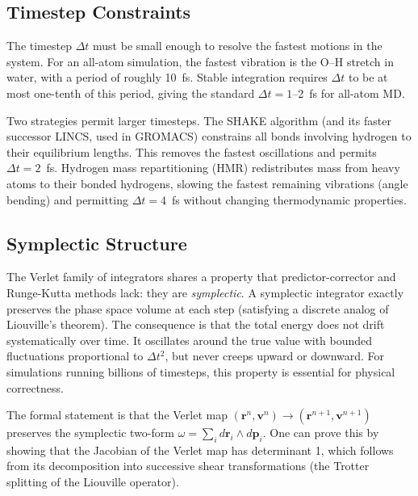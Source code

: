 \subsection{Timestep Constraints}
\label{sec:timestep}

The timestep $\Delta t$ must be small enough to resolve the fastest motions in the system. For an all-atom simulation, the fastest vibration is the O--H stretch in water, with a period of roughly 10~fs. Stable integration requires $\Delta t$ to be at most one-tenth of this period, giving the standard $\Delta t = 1$--2~fs for all-atom MD.

Two strategies permit larger timesteps. The SHAKE algorithm (and its faster successor LINCS, used in GROMACS) constrains all bonds involving hydrogen to their equilibrium lengths. This removes the fastest oscillations and permits $\Delta t = 2$~fs. Hydrogen mass repartitioning (HMR) redistributes mass from heavy atoms to their bonded hydrogens, slowing the fastest remaining vibrations (angle bending) and permitting $\Delta t = 4$~fs without changing thermodynamic properties.

\subsection{Symplectic Structure}
\label{sec:symplectic}

The Verlet family of integrators shares a property that predictor-corrector and Runge-Kutta methods lack: they are \emph{symplectic}. A symplectic integrator exactly preserves the phase space volume at each step (satisfying a discrete analog of Liouville's theorem). The consequence is that the total energy does not drift systematically over time. It oscillates around the true value with bounded fluctuations proportional to $\Delta t^2$, but never creeps upward or downward. For simulations running billions of timesteps, this property is essential for physical correctness.

The formal statement is that the Verlet map $(\mathbf{r}^n, \mathbf{v}^n) \to (\mathbf{r}^{n+1}, \mathbf{v}^{n+1})$ preserves the symplectic two-form $\omega = \sum_i d\mathbf{r}_i \wedge d\mathbf{p}_i$. One can prove this by showing that the Jacobian of the Verlet map has determinant 1, which follows from its decomposition into successive shear transformations (the Trotter splitting of the Liouville operator).

